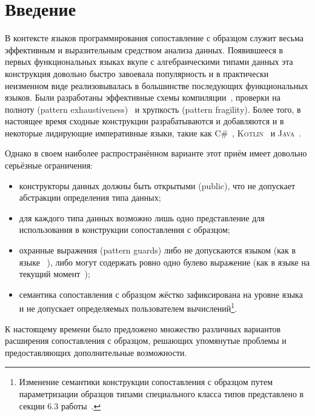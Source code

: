 \section*{Введение}
В контексте языков программирования сопоставление с образцом служит весьма эффективным и выразительным средством анализа данных. Появившееся в первых функциональных языках вкупе с алгебраическими типами данных эта конструкция довольно быстро завоевала популярность и в практически неизменном виде реализовывалась в большинстве последующих функциональных языков. Были разработаны эффективные схемы компиляции~\cite{fessant2001optimizing, maranget2008decisiontrees, scott2000whendo}, проверки на полноту (pattern exhaus\-ti\-ve\-ness)~\cite{maranget2007warnings} и хрупкость (pattern fragility). Более того, в настоящее время сходные конструкции разрабатываются и добавляются и в некоторые лидирующие императивные языки, такие как \textsc{C\#}~\cite{csharp2019pattern_matching}, \textsc{Kotlin}~\cite{kotlin2019when_expression} и \textsc{Java}~\cite{java2019proposal}. 

Однако в своем наиболее распространённом варианте этот приём имеет довольно серьёзные ограничения: 

\begin{itemize}
  \item конструкторы данных должны быть открытыми (public), что не допускает абстракции определения типа данных; 
  \item для каждого типа данных возможно лишь одно представление для использования в конструкции сопоставления с образцом; 
  \item охранные выражения (pattern guards) либо не допускаются языком (как в языке \SML{}~\cite{milner1997definition}), либо могут содержать ровно одно булево выражение (как в языке \ocaml{} на текущий момент~\cite{leroy2019manual});
  \item семантика сопоставления с образцом жёстко зафиксирована на уровне языка и не допускает определяемых пользователем вычислений\footnote{Изменение семантики конструкции сопоставления с образцом путем параметризации образцов типами специального класса типов представлено в секции 6.3 работы~\cite{syme2007extensible}.}.
\end{itemize}

\noindent К настоящему времени было предложено множество различных вариантов расширения сопоставления с образцом, решающих упомянутые проблемы и предоставляющих дополнительные возможности. 



